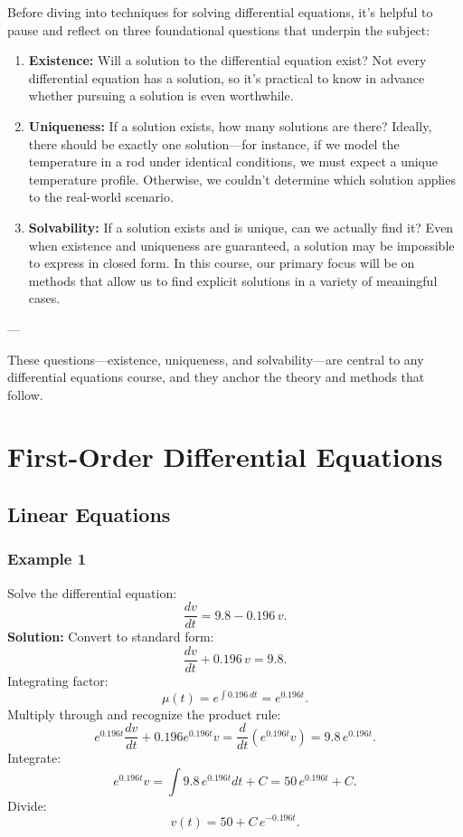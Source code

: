\documentclass[12pt]{book}
\begin{document}
Before diving into techniques for solving differential equations, it's helpful to pause and reflect on three foundational questions that underpin the subject:

\begin{enumerate}
  \item \textbf{Existence:}  
    Will a solution to the differential equation exist?  
    Not every differential equation has a solution, so it's practical to know in advance whether pursuing a solution is even worthwhile.

  \item \textbf{Uniqueness:}  
    If a solution exists, how many solutions are there?  
    Ideally, there should be exactly one solution—for instance, if we model the temperature in a rod under identical conditions, we must expect a unique temperature profile. Otherwise, we couldn't determine which solution applies to the real-world scenario.

  \item \textbf{Solvability:}  
    If a solution exists and is unique, can we actually find it?  
    Even when existence and uniqueness are guaranteed, a solution may be impossible to express in closed form. In this course, our primary focus will be on methods that allow us to find explicit solutions in a variety of meaningful cases.
\end{enumerate}

---

These questions—existence, uniqueness, and solvability—are central to any differential equations course, and they anchor the theory and methods that follow.


\chapter{First-Order Differential Equations}
\section{Linear Equations}

\subsection*{Example 1}
Solve the differential equation:
\[
\frac{dv}{dt} = 9.8 - 0.196\,v.
\]
\textbf{Solution:}
Convert to standard form:
\[
\frac{dv}{dt} + 0.196\,v = 9.8.
\]
Integrating factor:
\[
\mu(t) = e^{\int 0.196\,dt} = e^{0.196t}.
\]
Multiply through and recognize the product rule:
\[
e^{0.196t} \frac{dv}{dt} + 0.196 e^{0.196t} v = \frac{d}{dt}(e^{0.196t} v) = 9.8\,e^{0.196t}.
\]
Integrate:
\[
e^{0.196t} v = \int 9.8\,e^{0.196t} dt + C = 50\,e^{0.196t} + C.
\]
Divide:
\[
v(t) = 50 + C\,e^{-0.196t}.
\]
\end{document}
